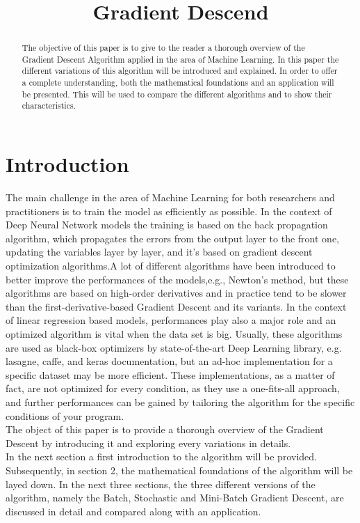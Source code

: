 \documentclass[conference]{IEEEtran}
\begin{document}
\title{Gradient Descend\\}

\author{
}

\maketitle


\begin{abstract}
The objective of this paper is to give to the reader a thorough overview of the Gradient Descent Algorithm applied in the area of Machine Learning. In this paper the different variations of this algorithm will be introduced and explained. In order to offer a complete understanding, both the mathematical foundations and an application will be presented. This will be used to compare the different algorithms and to show their characteristics.
\end{abstract}


\section{Introduction}
The main challenge in the area of Machine Learning for both researchers and practitioners is to train the model as efficiently as possible. In the context of Deep Neural Network models the training is based on the back propagation algorithm, which propagates the errors from the output layer to the front one, updating the variables layer by layer, and it's based on gradient descent optimization algorithms.A lot of different algorithms have been introduced to better improve the performances of the models,e.g., Newton’s method, but these algorithms are based on high-order derivatives and in practice tend to be slower than the first-derivative-based Gradient Descent and its variants. 
In the context of linear regression based models, performances play also a major role and an optimized algorithm is vital when the data set is big. Usually, these algorithms are  used as black-box optimizers by state-of-the-art Deep Learning library, e.g. lasagne, caffe, and keras documentation, but an ad-hoc implementation for a specific dataset may be more efficient. These implementations, as a matter of fact, are not optimized for every condition, as they use a one-fits-all approach, and further performances can be gained by tailoring the algorithm for the specific conditions of your program.\\
The object of this paper is to provide a thorough overview of the Gradient Descent by introducing it and exploring every variations in details. 
\\
In the next section a first introduction to the algorithm will be provided. Subsequently, in section 2, the mathematical foundations of the algorithm will be layed down. In the next three sections, the three different versions of the algorithm, namely the Batch, Stochastic and Mini-Batch Gradient Descent, are discussed in detail and compared along with an application.
\end{document}
